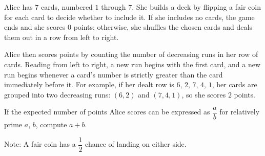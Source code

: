 Alice has $7$ cards, numbered $1$ through $7$. She builds a deck by flipping a fair coin for each card to decide whether to include it. If she includes no cards, the game ends and she scores $0$ points; otherwise, she shuffles the chosen cards and deals them out in a row from left to right.

Alice then scores points by counting the number of decreasing runs in her row of cards. Reading from left to right, a new run begins with the first card, and a new run begins whenever a card's number is strictly greater than the card immediately before it. For example, if her dealt row is $6$, $2$, $7$, $4$, $1$, her cards are grouped into two decreasing runs: $(6,2)$ and $(7,4,1)$, so she scores $2$ points.

If the expected number of points Alice scores can be expressed as $\dfrac{a}{b}$ for relatively prime $a$, $b$, compute $a+b$.

Note: A fair coin has a $\dfrac{1}{2}$ chance of landing on either side.
